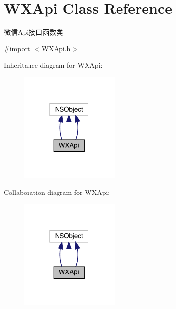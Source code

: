 \hypertarget{interface_w_x_api}{}\section{W\+X\+Api Class Reference}
\label{interface_w_x_api}


微信\+Api接口函数类  




{\ttfamily \#import $<$W\+X\+Api.\+h$>$}



Inheritance diagram for W\+X\+Api\+:\nopagebreak
\begin{figure}[H]
\begin{center}
\leavevmode
\includegraphics[width=139pt]{interface_w_x_api__inherit__graph}
\end{center}
\end{figure}


Collaboration diagram for W\+X\+Api\+:\nopagebreak
\begin{figure}[H]
\begin{center}
\leavevmode
\includegraphics[width=139pt]{interface_w_x_api__coll__graph}
\end{center}
\end{figure}
